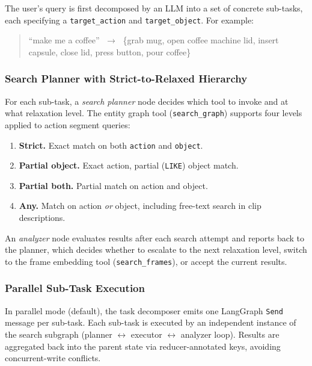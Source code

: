 \documentclass[10pt,twocolumn]{article}
\begin{document}
The user's query is first decomposed by an LLM into a set of
concrete sub-tasks, each specifying a \texttt{target\_action}
and \texttt{target\_object}.  For example:
\begin{quote}\small
  ``make me a coffee'' $\;\to\;$ \{grab mug, open coffee machine lid,
  insert capsule, close lid, press button, pour coffee\}
\end{quote}

\subsubsection{Search Planner with Strict-to-Relaxed Hierarchy}

For each sub-task, a \emph{search planner} node decides which
tool to invoke and at what relaxation level.  The entity graph
tool (\texttt{search\_graph}) supports four levels applied to
action segment queries:

\begin{enumerate}[leftmargin=*,itemsep=1pt,label=\textbf{L\arabic*}:]
  \item \textbf{Strict.} Exact match on both \texttt{action} and
    \texttt{object}.
  \item \textbf{Partial object.} Exact action, partial
    (\texttt{LIKE}) object match.
  \item \textbf{Partial both.} Partial match on action and object.
  \item \textbf{Any.} Match on action \emph{or} object, including
    free-text search in clip descriptions.
\end{enumerate}

An \emph{analyzer} node evaluates results after each search
attempt and reports back to the planner, which decides whether to
escalate to the next relaxation level, switch to the frame
embedding tool (\texttt{search\_frames}), or accept the current
results.

\subsubsection{Parallel Sub-Task Execution}

In parallel mode (default), the task decomposer emits one
LangGraph \texttt{Send} message per sub-task.  Each sub-task is
executed by an independent instance of the search subgraph
(planner $\leftrightarrow$ executor $\leftrightarrow$ analyzer
loop).  Results are aggregated back into the parent state via
reducer-annotated keys, avoiding concurrent-write conflicts.
\end{document}
